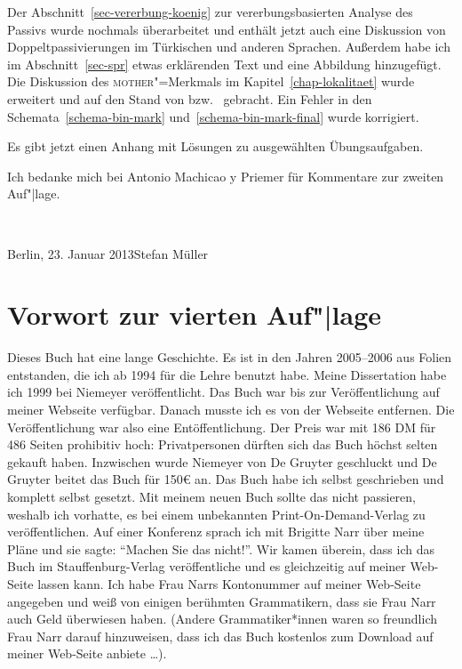 Der Abschnitt~\ref{sec-vererbung-koenig} zur vererbungsbasierten Analyse des Passivs wurde nochmals
überarbeitet und enthält jetzt auch eine Diskussion von Doppeltpassivierungen im Türkischen und
anderen Sprachen. Außerdem habe ich im Abschnitt~\ref{sec-spr} etwas erklärenden Text und eine
Abbildung hinzugefügt. Die Diskussion des \textsc{mother}"=Merkmals im Kapitel~\ref{chap-lokalitaet} wurde erweitert und auf
den Stand von  bzw.\  gebracht. 
Ein Fehler in den Schemata~\ref{schema-bin-mark} und~\ref{schema-bin-mark-final} wurde korrigiert.

Es gibt jetzt einen Anhang mit Lösungen zu ausgewählten Übungsaufgaben.

Ich bedanke mich bei Antonio Machicao y Priemer für Kommentare zur zweiten Auf"|lage.

~\medskip

\noindent
Berlin, 23. Januar 2013\hfill Stefan Müller


\section*{Vorwort zur vierten Auf"|lage}

Dieses Buch hat eine lange Geschichte. Es ist in den Jahren 2005–2006 aus Folien entstanden, die ich
ab 1994 für die Lehre benutzt habe. Meine Dissertation habe ich 1999 bei Niemeyer
veröffentlicht. Das Buch war bis zur Veröffentlichung auf meiner Webseite verfügbar. Danach musste
ich es von der Webseite entfernen. Die Veröffentlichung war also eine Entöffentlichung. Der Preis
war mit 186 DM für 486 Seiten prohibitiv hoch: Privatpersonen dürften sich das Buch höchst selten
gekauft haben. Inzwischen wurde Niemeyer von De Gruyter geschluckt und De Gruyter beitet das Buch für 150€
an. Das Buch habe ich selbst geschrieben und komplett selbst gesetzt. Mit meinem neuen Buch sollte das nicht passieren,
weshalb ich vorhatte, es bei einem unbekannten Print-On-Demand-Verlag zu veröffentlichen. Auf einer
Konferenz sprach ich mit Brigitte Narr über meine Pläne und sie sagte: "`Machen Sie das
nicht!"'. Wir kamen überein, dass ich das Buch im Stauffenburg-Verlag veröffentliche und es
gleichzeitig auf meiner Web-Seite lassen kann. Ich habe Frau Narrs Kontonummer auf meiner Web-Seite
angegeben und weiß von einigen berühmten Grammatikern, dass sie Frau Narr auch Geld überwiesen
haben. (Andere Grammatiker*innen waren so freundlich Frau Narr darauf hinzuweisen, dass ich das Buch
kostenlos zum Download auf meiner Web-Seite anbiete \ldots). 

